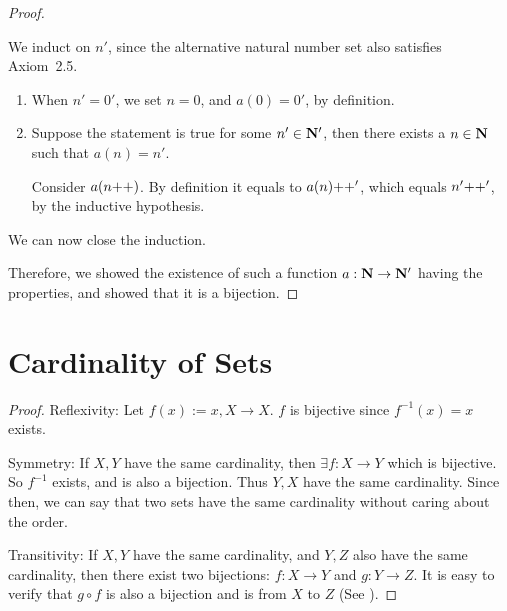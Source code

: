 \begin{proof}
\begin{enumerate}
	We induct on $n'$, since the alternative natural number set also satisfies Axiom~2.5.
	\begin{enumerate}
		\item \mybcbox When $n' = 0'$, we set $n = 0$, and $a(0) = 0'$, by definition.
		
		\item \myisbox Suppose the statement is true for some $n' \in \mathbf{N}'$, then there exists a $n \in \mathbf{N}$ such that $a(n) = n'$. 
		
		Consider $a(n{+}{+})$. By definition it equals to $a(n){+}{+}'$, which equals $n'{+}{+}'$, by the inductive hypothesis.
	\end{enumerate}

	We can now close the induction.
\end{enumerate}

	Therefore, we showed the existence of such a function $a: \mathbf{N} \to \mathbf{N}'$ having the properties, and showed that it is a bijection.
\end{proof}

\section{Cardinality of Sets}

\begin{proof}
Reflexivity: Let $f(x):= x, X \rightarrow X$. $f$ is bijective since $f^{-1}(x) = x$ exists.

Symmetry: If $X,Y$ have the same cardinality, then $\exists f:X\rightarrow Y$ which is bijective. So 
$f^{-1}$ exists, and is also a bijection. Thus $Y,X$ have the same cardinality. Since then, we can say 
that two sets have the same cardinality without caring about the order.

Transitivity: If $X,Y$ have the same cardinality, and $Y,Z$ also have the same cardinality, then there 
exist two bijections: $f:X \rightarrow Y$ and $g:Y \rightarrow Z$. It is easy to verify that $g \circ f$ 
is also a bijection and is from $X$ to $Z$ (See ).
\end{proof}

